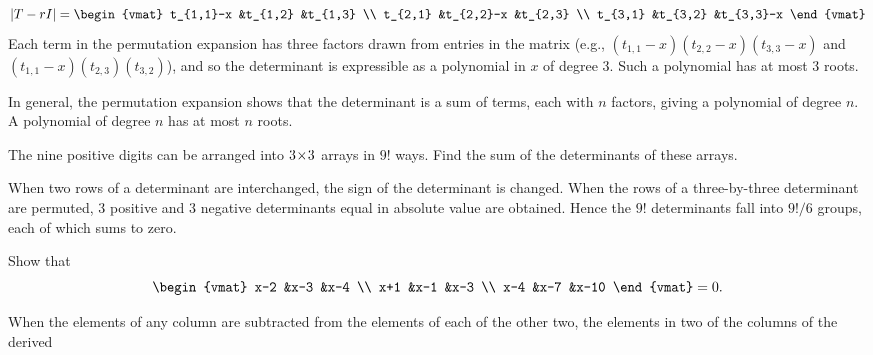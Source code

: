 \begin{exercises}
\begin{answer}
      \begin{equation*}
        \deter{T-rI}
        =
        \begin{vmat}
          t_{1,1}-x  &t_{1,2}   &t_{1,3}  \\ 
          t_{2,1}    &t_{2,2}-x &t_{2,3}  \\ 
          t_{3,1}    &t_{3,2}   &t_{3,3}-x  
        \end{vmat}
      \end{equation*}
      Each term in the permutation expansion has three factors drawn from 
      entries in the matrix (e.g., $(t_{1,1}-x)(t_{2,2}-x)(t_{3,3}-x)$
      and $(t_{1,1}-x)(t_{2,3})(t_{3,2})$), and so the determinant is
      expressible as a polynomial in $x$ of degree $3$.
      Such a polynomial has at most $3$ roots.

      In general, the permutation expansion shows that
      the determinant is a sum of terms, each
      with \( n \) factors, giving a polynomial of degree $n$.
      A polynomial of degree \( n \) has at most \( n \) roots. 
    \end{answer}
  \puzzle \item 
    \cite{MathMag63Q307}
    The nine positive digits can be arranged into \( 3 \! \times \! 3 \) arrays
    in \( 9! \) ways.
    Find the sum of the determinants of these arrays.
    \begin{answer}
      \answerasgiven
      When two rows of a determinant are interchanged, the sign of the
      determinant is changed.
      When the rows of a three-by-three determinant are permuted, \( 3 \)
      positive and \( 3 \) negative determinants equal in absolute value
      are obtained.
      Hence the \( 9! \) determinants fall into \( 9!/6 \) groups, each of
      which sums to zero.  
    \end{answer}
  \item 
    \cite{MathMag63Q237}
    Show that
    \begin{equation*}
      \begin{vmat}
        x-2  &x-3  &x-4  \\
        x+1  &x-1  &x-3  \\
        x-4  &x-7  &x-10
      \end{vmat}=0.
    \end{equation*}
    \begin{answer}
      \answerasgiven
      When the elements of any column are subtracted from the elements of
      each of the other two, the elements in two of the columns of the derived

\end{answer}
\end{exercises}
